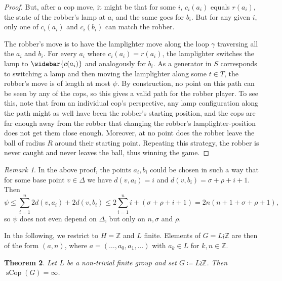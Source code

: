 \documentclass{amsart}
\newtheorem{theorem}{Theorem}[section]
\theoremstyle{definition}
\theoremstyle{remark}
\newtheorem{remark}[theorem]{Remark}
\theoremstyle{remark}
\theoremstyle{definition}
\newcommand{\sCop}{\operatorname{sCop}}
\newcommand{\Z}{\mathbb{Z}} %
\renewcommand{\leq}{\leqslant}
\begin{document}
\begin{proof}
	But, after a cop move, it might be that for some \(i\), \(c_i(a_i)\) equals \(r(a_i)\), the state of the robber's lamp at \(a_i\) and the same goes for \(b_i\). But for any given \(i\), only one of \(c_i(a_i)\) and \(c_i(b_i)\) can match the robber.

	The robber's move is to have the lamplighter move along the loop $\gamma$ traversing all the \(a_i\) and \(b_i\). For every \(a_i\) where \(c_i(a_i) = r(a_i)\), the lamplighter switches the lamp to \(\widebar{c(a_i)}\) and analogously for \(b_i\). As a generator in \(S\) corresponds to switching a lamp and then moving the lamplighter along some \(t \in T\), the robber's move is of length at most \(\psi\).
	By construction, no point on this path can be seen by any of the cops, so this gives a valid path for the robber player. To see this, note that from an individual cop's perspective, any lamp configuration along the path might as well have been the robber's starting position, and the cops are far enough away from the robber that changing the robber's lamplighter-position does not get them close enough.
	Moreover, at no point does the robber leave the ball of radius $R$ around their starting point. Repeating this strategy, the robber is never caught and never leaves the ball, thus winning the game.
\end{proof}

\begin{remark}
    In the above proof, the points $a_i, b_i$ could be chosen in such a way that for some base point $v\in \Delta$ we have $d(v,a_i)=i$ and $d(v,b_i)=\sigma+\rho+i+1$. Then
    $$
    \psi \leq \sum_{i=1}^n 2d(v,a_i) + 2d(v,b_i) \leq 2\sum_{i=1}^n i + (\sigma + \rho +i + 1) = 2n(n+1 + \sigma +\rho + 1),
    $$
    so $\psi$ does not even depend on $\Delta$, but only on $n, \sigma$ and $\rho$.
\end{remark}

In the following, we restrict to $H=\mathbb{Z}$ and $L$ finite. Elements of $G = L\wr \mathbb{Z}$ are then of the form $(a,n)$, where $a = (\ldots , a_0, a_1, \ldots)$ with $a_k \in L$ for $k,n \in \mathbb{Z}$.

\begin{theorem}\label{thm:scop-lamplighter}
	Let \(L\) be a non-trivial finite group and set \(G \coloneq L \wr \Z\).
	Then \(\sCop(G) = \infty\).
\end{theorem}
\end{document}
